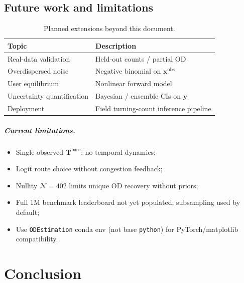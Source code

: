 \documentclass[11pt,a4paper]{report}
\newcommand{\Tbase}{\mathbf{T}^{\mathrm{base}}}
\newcommand{\mathbfy}{\mathbf{y}}
\newcommand{\mathbfx}{\mathbf{x}}
\begin{document}
\section{Future work and limitations}
\label{sec:ch3-future}

\begin{table}[ht]
\centering
\caption{Planned extensions beyond this document.}
\label{tab:future}
\begin{tabular}{@{}ll@{}}
\toprule
\textbf{Topic} & \textbf{Description} \\
\midrule
Real-data validation & Held-out counts / partial OD \\
Overdispersed noise & Negative binomial on $\mathbfx^{\mathrm{obs}}$ \\
User equilibrium & Nonlinear forward model \\
Uncertainty quantification & Bayesian / ensemble CIs on $\mathbfy$ \\
Deployment & Field turning-count inference pipeline \\
\bottomrule
\end{tabular}
\end{table}

\paragraph{Current limitations.}
\begin{itemize}[leftmargin=*]
    \item Single observed $\Tbase$; no temporal dynamics;
    \item Logit route choice without congestion feedback;
    \item Nullity $\mathcal{N}=402$ limits unique OD recovery without priors;
    \item Full 1M benchmark leaderboard not yet populated; subsampling used by default;
    \item Use \texttt{ODEstimation} conda env (not base \texttt{python}) for PyTorch/matplotlib compatibility.
\end{itemize}


\chapter*{Conclusion}
\end{document}
